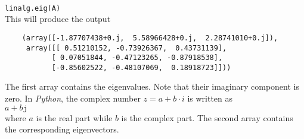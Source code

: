 \documentclass{article}
\begin{document}
\\[0.2cm]
\hspace*{1.3cm}
\texttt{linalg.eig(A)}
\\[0.2cm]
This will produce the output
\begin{verbatim}
    (array([-1.87707438+0.j,  5.58966428+0.j,  2.28741010+0.j]),
     array([[ 0.51210152, -0.73926367,  0.43731139],
           [ 0.07051844, -0.47123265, -0.87918538],
           [-0.85602522, -0.48107069,  0.18918723]]))
\end{verbatim}
The first array contains the eigenvalues.  Note that their imaginary component is zero.  In
\textsl{Python}, the complex number $z = a + b \cdot i$ is written as
\\[0.2cm]
\hspace*{1.3cm}
$a+b\mathtt{j}$
\\[0.2cm]
where $a$ is the real part while $b$ is the complex part.  
The second array contains the corresponding eigenvectors.
\end{document}
